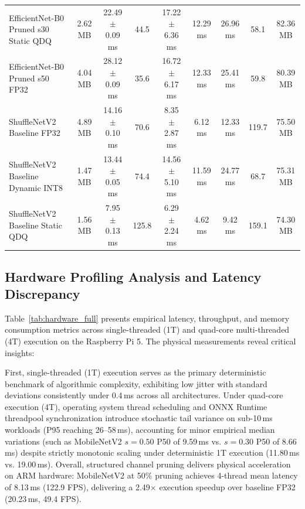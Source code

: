 \documentclass{jcse}
\begin{document}
\begin{table}
{\begin{tabular}{lcccccccc}
EfficientNet-B0 Pruned s30 Static QDQ & 2.62 MB & 22.49 $\pm$ 0.09 ms & 44.5 & 17.22 $\pm$ 6.36 ms & 12.29 ms & 26.96 ms & 58.1 & 82.36 MB \\
EfficientNet-B0 Pruned s50 FP32 & 4.04 MB & 28.12 $\pm$ 0.09 ms & 35.6 & 16.72 $\pm$ 6.17 ms & 12.33 ms & 25.41 ms & 59.8 & 80.39 MB \\
\midrule
ShuffleNetV2 Baseline FP32 & 4.89 MB & 14.16 $\pm$ 0.10 ms & 70.6 & 8.35 $\pm$ 2.87 ms & 6.12 ms & 12.33 ms & 119.7 & 75.50 MB \\
ShuffleNetV2 Baseline Dynamic INT8 & 1.47 MB & 13.44 $\pm$ 0.05 ms & 74.4 & 14.56 $\pm$ 5.10 ms & 11.59 ms & 24.77 ms & 68.7 & 75.31 MB \\
ShuffleNetV2 Baseline Static QDQ & 1.56 MB & 7.95 $\pm$ 0.13 ms & 125.8 & 6.29 $\pm$ 2.24 ms & 4.62 ms & 9.42 ms & 159.1 & 74.30 MB \\
\bottomrule
\end{tabular}%
}
\end{table}

\subsection{Hardware Profiling Analysis and Latency Discrepancy}Table~\ref{tab:hardware_full} presents empirical latency, throughput, and memory consumption metrics across single-threaded (1T) and quad-core multi-threaded (4T) execution on the Raspberry Pi 5. The physical measurements reveal critical insights:

First, single-threaded (1T) execution serves as the primary deterministic benchmark of algorithmic complexity, exhibiting low jitter with standard deviations consistently under 0.4\,ms across all architectures. Under quad-core execution (4T), operating system thread scheduling and ONNX Runtime threadpool synchronization introduce stochastic tail variance on sub-10\,ms workloads (P95 reaching 26--58\,ms), accounting for minor empirical median variations (such as MobileNetV2 $s=0.50$ P50 of 9.59\,ms vs. $s=0.30$ P50 of 8.66\,ms) despite strictly monotonic scaling under deterministic 1T execution (11.80\,ms vs. 19.00\,ms). Overall, structured channel pruning delivers physical acceleration on ARM hardware: MobileNetV2 at 50\% pruning achieves 4-thread mean latency of 8.13\,ms (122.9 FPS), delivering a 2.49$\times$ execution speedup over baseline FP32 (20.23\,ms, 49.4 FPS).
\end{document}
